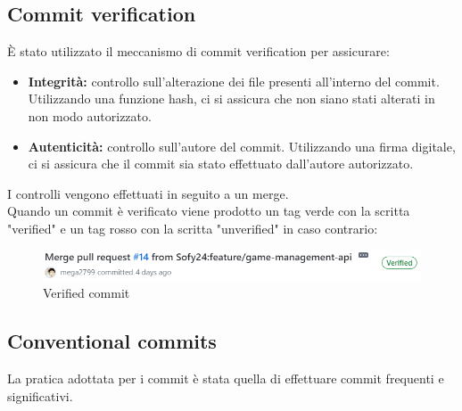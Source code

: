 \subsection{Commit verification}
È stato utilizzato il meccanismo di commit verification per assicurare:
\begin{itemize}
    \item \textbf{Integrità:} controllo sull'alterazione dei file presenti all'interno del commit.  Utilizzando una funzione hash, ci si assicura che non siano stati alterati in non modo autorizzato.
    \item \textbf{Autenticità:} controllo sull'autore del commit. Utilizzando una firma digitale, ci si assicura che il commit sia stato effettuato dall'autore autorizzato.
\end{itemize}
I controlli vengono effettuati in seguito a un merge. \\
Quando un commit è verificato viene prodotto un tag verde con la scritta "verified" e un tag rosso con la scritta "unverified" in caso contrario:
\begin{figure}[h!]
    \centering 
    \includegraphics[scale=0.7]{report/img/verified_commit.png}
    \caption{Verified commit}
    \label{verified_commit}
    \end{figure}
\subsection{Conventional commits}
La pratica adottata per i commit è stata quella di effettuare commit frequenti e significativi.

